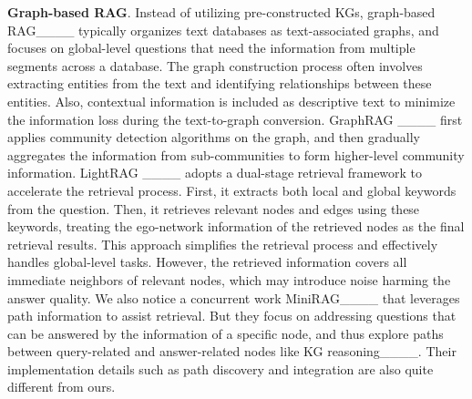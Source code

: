 \textbf{Graph-based RAG}. Instead of utilizing pre-constructed KGs,
graph-based RAG____ typically organizes text databases as text-associated graphs, and focuses on global-level questions that need the information from multiple segments across a database. The graph construction process often involves extracting entities from the text and identifying relationships between these entities. Also, contextual information is included as descriptive text to minimize the information loss during the text-to-graph conversion. GraphRAG ____ first applies community detection algorithms on the graph, and then gradually aggregates the information from sub-communities to form higher-level community information. LightRAG ____ adopts a dual-stage retrieval framework to accelerate the retrieval process. First, it extracts both local and global keywords from the question. Then, it retrieves relevant nodes and edges using these keywords, treating the ego-network information of the retrieved nodes as the final retrieval results. This approach simplifies the retrieval process and effectively handles global-level tasks. However, the retrieved information covers all immediate neighbors of relevant nodes, which may introduce noise harming the answer quality. We also notice a concurrent work MiniRAG____ that leverages path information to assist retrieval. But they focus on addressing questions that can be answered by the information of a specific node, and thus explore paths between query-related and answer-related nodes like KG reasoning____. Their implementation details such as path discovery and integration are also quite different from ours.